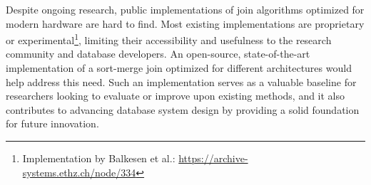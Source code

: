 Despite ongoing research, public implementations of join algorithms optimized for modern hardware
are hard to find. Most existing implementations are proprietary or 
experimental\footnote{Implementation by Balkesen et al.: \url{https://archive-systems.ethz.ch/node/334}}, limiting their
accessibility and usefulness to the research community and database developers. An open-source,
state-of-the-art implementation of a sort-merge join optimized for different architectures would
help address this need. Such an implementation serves as a valuable baseline for researchers
looking to evaluate or improve upon existing methods, and it also contributes to advancing database
system design by providing a solid foundation for future innovation.

